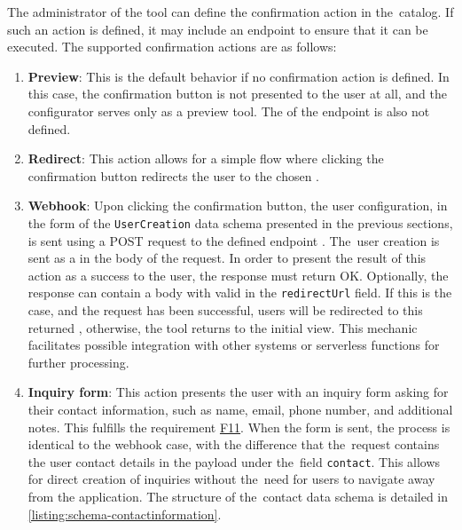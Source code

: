 The administrator of the tool can define the confirmation action in the~catalog. If such an action is defined, it may include an endpoint  to ensure that it can be executed. The supported confirmation actions are as follows:

\begin{enumerate}
    \item \textbf{Preview}: This is the default behavior if no confirmation action is defined. In this case, the confirmation button is not presented to the user at all, and the configurator serves only as a preview tool. The  of the endpoint is also not defined.
    \item \textbf{Redirect}: This action allows for a simple flow where clicking the confirmation button redirects the user to the chosen .
    \item \textbf{Webhook}: Upon clicking the confirmation button, the user configuration, in the form of the \texttt{UserCreation} data schema presented in the previous sections, is sent using a POST request to the defined endpoint . The~user creation is sent as a  in the body of the request. In order to present the result of this action as a success to the user, the response must return OK. Optionally, the response can contain a  body with valid  in the \texttt{redirectUrl} field. If this is the case, and the request has been successful, users will be redirected to this returned , otherwise, the tool returns to the initial view. This mechanic facilitates possible integration with other systems or serverless functions for further processing.
    \item \textbf{Inquiry form}: This action presents the user with an inquiry form asking for their contact information, such as name, email, phone number, and additional notes. This fulfills the requirement \hyperref[itm:F11]{F11}. When the form is sent, the process is identical to the webhook case, with the difference that the~request contains the user contact details in the  payload under the~field \texttt{contact}. This allows for direct creation of inquiries without the~need for users to navigate away from the application. The structure of the~contact data schema is detailed in \autoref{listing:schema-contactinformation}.
\end{enumerate}


